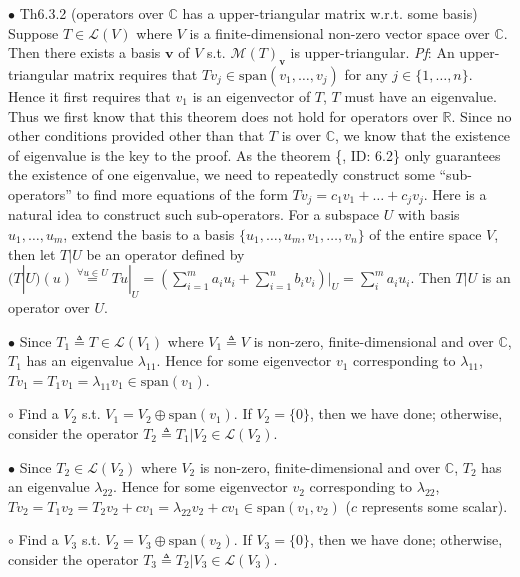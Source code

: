 \documentclass{article}
\begin{document}
\begin{Th}{$\bullet$ Th6.3.2 (operators over $\mathbb{C}$ has a upper-triangular matrix w.r.t. some basis)}
    Suppose $T\in\mathcal{L}(V)$ where $V$ is a finite-dimensional non-zero vector space over $\mathbb{C}$. Then there exists a basis $\pmb{v}$ of $V$ s.t. $\mathcal{M}(T)_{\pmb{v}}$ is upper-triangular.
    \tcblower
    \textit{Pf}: An upper-triangular matrix requires that $Tv_j\in\text{span}(v_1, \dots, v_j)$ for any $j\in\{1, \dots, n\}$. Hence it first requires that $v_1$ is an eigenvector of $T$, $T$ must have an eigenvalue. Thus we first know that this theorem does not hold for operators over $\mathbb{R}$. Since no other conditions provided other than that $T$ is over $\mathbb{C}$, we know that the existence of eigenvalue is the key to the proof. As the theorem \{, ID: 6.2\} only guarantees the existence of one eigenvalue, we need to repeatedly construct some ``sub-operators'' to find more equations of the form $Tv_j = c_1v_1 + \dots + c_jv_j$. Here is a natural idea to construct such sub-operators. For a subspace $U$ with basis $u_1, \dots, u_m$, extend the basis to a basis $\{u_1, \dots, u_m, v_1, \dots, v_n\}$ of the entire space $V$, then let $T|U$ be an operator defined by $(T|U)(u) \overset{\forall u\in U}{=} Tu|_U = (\sum_{i=1}^{m}a_iu_i + \sum_{i=1}^{n}b_iv_i)|_U = \sum_{i}^{m}a_iu_i$. Then $T|U$ is an operator over $U$.
    \begin{compactenum}
        \item[$\bullet$] Since $T_1\triangleq T\in\mathcal{L}(V_1)$ where $V_1 \triangleq V$ is non-zero, finite-dimensional and over $\mathbb{C}$, $T_1$ has an eigenvalue $\lambda_{11}$. Hence for some eigenvector $v_1$ corresponding to $\lambda_{11}$, $Tv_1 = T_1v_1 = \lambda_{11}v_1\in\text{span}(v_1)$.  
        \item[$\circ$] Find a $V_2$ s.t. $V_1 = V_2 \oplus \text{span}(v_1)$. If $V_2 = \{0\}$, then we have done; otherwise, consider the operator $T_2\triangleq T_1|V_2\in\mathcal{L}(V_2)$. 
        \item[$\bullet$] Since $T_2\in\mathcal{L}(V_2)$ where $V_2$ is non-zero, finite-dimensional and over $\mathbb{C}$, $T_2$ has an eigenvalue $\lambda_{22}$. Hence for some eigenvector $v_2$ corresponding to $\lambda_{22}$, $Tv_2 = T_1v_2 = T_2v_2 + cv_1 = \lambda_{22}v_2 + cv_1\in\text{span}(v_1, v_2)$ ($c$ represents some scalar).
        \item[$\circ$] Find a $V_3$ s.t. $V_2 = V_3 \oplus \text{span}(v_2)$. If $V_3=\{0\}$, then we have done; otherwise, consider the operator $T_3\triangleq T_2|V_3\in\mathcal{L}(V_3)$.

\end{compactenum}
\end{Th}
\end{document}
